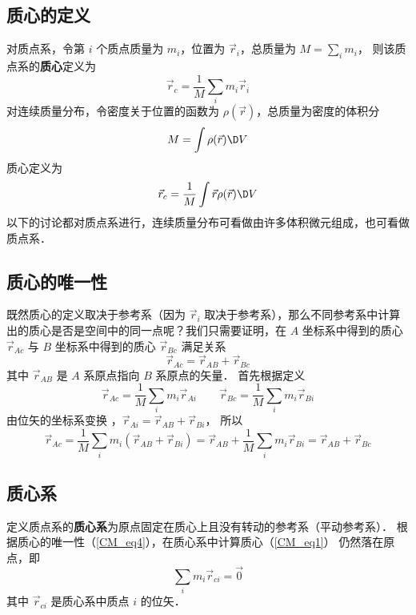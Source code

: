 

\subsection{质心的定义}

对质点系，令第 $i$ 个质点质量为 $m_i$，位置为 ${\vec r_i}$，总质量为 $M = \sum\limits_i {{m_i}}$， 则该质点系的\textbf{质心}定义为
\begin{equation}\label{CM_eq1}
{\vec r_c} = \frac{1}{M}\sum\limits_i {{m_i}{{\vec r}_i}} 
\end{equation}
对连续质量分布，令密度关于位置的函数为 $\rho (\vec r)$，总质量为密度的体积分 %
\begin{equation}
M = \int {\rho (\vec r)\D V} 
\end{equation}
质心定义为
\begin{equation}
{\vec r_c} = \frac{1}{M}\int {\vec r\rho (\vec r)\D V}
\end{equation}
以下的讨论都对质点系进行，连续质量分布可看做由许多体积微元组成，也可看做质点系．

\subsection{质心的唯一性}
既然质心的定义取决于参考系（因为 $\vec r_i$ 取决于参考系），那么不同参考系中计算出的质心是否是空间中的同一点呢？我们只需要证明，在 $A$ 坐标系中得到的质心 $\vec r_{Ac}$ 与 $B$ 坐标系中得到的质心 $\vec r_{Bc}$ 满足关系
\begin{equation}\label{CM_eq4}
{\vec r_{Ac}} = {\vec r_{AB}} + {\vec r_{Bc}}
\end{equation}
其中 $\vec r_{AB}$ 是 $A$ 系原点指向 $B$ 系原点的矢量． 首先根据定义
\begin{equation}
{\vec r_{Ac}} = \frac{1}{M}\sum\limits_i {{m_i}{{\vec r}_{Ai}}} \qquad {\vec r_{Bc}} = \frac{1}{M}\sum\limits_i {{m_i}{{\vec r}_{Bi}}} 
\end{equation}
由位矢的坐标系变换%
，${\vec r_{Ai}} = {\vec r_{AB}} + {\vec r_{Bi}}$， 所以
\begin{equation}
{\vec r_{Ac}} = \frac{1}{M}\sum\limits_i {{m_i}({{\vec r}_{AB}} + {{\vec r}_{Bi}})}  = {\vec r_{AB}} + \frac{1}{M}\sum\limits_i {{m_i}{{\vec r}_{Bi}}}  = {\vec r_{AB}} + {\vec r_{Bc}}
\end{equation}
 
\subsection{质心系}
定义质点系的\textbf{质心系}为原点固定在质心上且没有转动的参考系（平动参考系）．%
根据质心的唯一性（\autoref{CM_eq4}），在质心系中计算质心（\autoref{CM_eq1}） 仍然落在原点，即
\begin{equation}\label{CM_eq7}
\sum\limits_i {{m_i}{{\vec r}_{ci}}} = \vec 0
\end{equation}
其中 $\vec r_{ci}$ 是质心系中质点 $i$ 的位矢．

